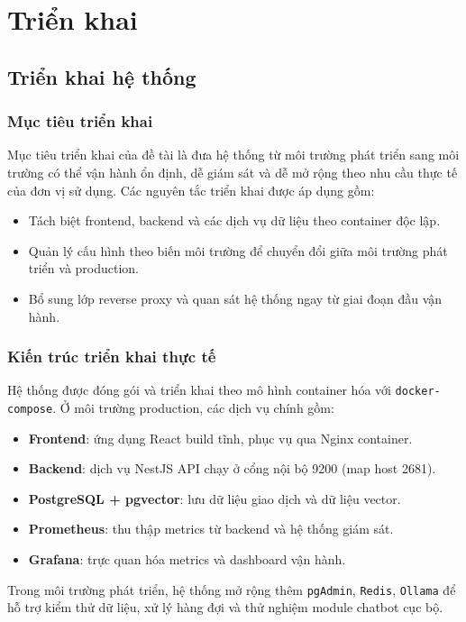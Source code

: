 \section{Triển khai}

\subsection{Triển khai hệ thống}

\subsubsection{Mục tiêu triển khai}
Mục tiêu triển khai của đề tài là đưa hệ thống từ môi trường phát triển sang môi trường có thể vận hành ổn định, dễ giám sát và dễ mở rộng theo nhu cầu thực tế của đơn vị sử dụng. Các nguyên tắc triển khai được áp dụng gồm:
\begin{itemize}
	\item Tách biệt frontend, backend và các dịch vụ dữ liệu theo container độc lập.
	\item Quản lý cấu hình theo biến môi trường để chuyển đổi giữa môi trường phát triển và production.
	\item Bổ sung lớp reverse proxy và quan sát hệ thống ngay từ giai đoạn đầu vận hành.
\end{itemize}

\subsubsection{Kiến trúc triển khai thực tế}
Hệ thống được đóng gói và triển khai theo mô hình container hóa với \texttt{docker-compose}. Ở môi trường production, các dịch vụ chính gồm:
\begin{itemize}
	\item \textbf{Frontend}: ứng dụng React build tĩnh, phục vụ qua Nginx container.
	\item \textbf{Backend}: dịch vụ NestJS API chạy ở cổng nội bộ 9200 (map host 2681).
	\item \textbf{PostgreSQL + pgvector}: lưu dữ liệu giao dịch và dữ liệu vector.
	\item \textbf{Prometheus}: thu thập metrics từ backend và hệ thống giám sát.
	\item \textbf{Grafana}: trực quan hóa metrics và dashboard vận hành.
\end{itemize}

Trong môi trường phát triển, hệ thống mở rộng thêm \texttt{pgAdmin}, \texttt{Redis}, \texttt{Ollama} để hỗ trợ kiểm thử dữ liệu, xử lý hàng đợi và thử nghiệm module chatbot cục bộ.


